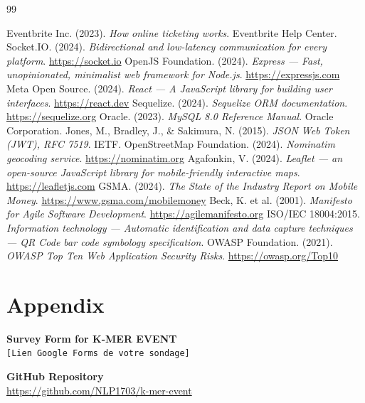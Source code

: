 \documentclass[12pt,a4paper]{report}
\begin{document}
\begin{thebibliography}{99}
 Eventbrite Inc. (2023). \emph{How online ticketing works}. Eventbrite Help Center.
 Socket.IO. (2024). \emph{Bidirectional and low-latency communication for every platform}. \url{https://socket.io}
 OpenJS Foundation. (2024). \emph{Express --- Fast, unopinionated, minimalist web framework for Node.js}. \url{https://expressjs.com}
 Meta Open Source. (2024). \emph{React --- A JavaScript library for building user interfaces}. \url{https://react.dev}
 Sequelize. (2024). \emph{Sequelize ORM documentation}. \url{https://sequelize.org}
 Oracle. (2023). \emph{MySQL 8.0 Reference Manual}. Oracle Corporation.
 Jones, M., Bradley, J., \& Sakimura, N. (2015). \emph{JSON Web Token (JWT), RFC 7519}. IETF.
 OpenStreetMap Foundation. (2024). \emph{Nominatim geocoding service}. \url{https://nominatim.org}
 Agafonkin, V. (2024). \emph{Leaflet --- an open-source JavaScript library for mobile-friendly interactive maps}. \url{https://leafletjs.com}
 GSMA. (2024). \emph{The State of the Industry Report on Mobile Money}. \url{https://www.gsma.com/mobilemoney}
 Beck, K. et al. (2001). \emph{Manifesto for Agile Software Development}. \url{https://agilemanifesto.org}
 ISO/IEC 18004:2015. \emph{Information technology --- Automatic identification and data capture techniques --- QR Code bar code symbology specification}.
 OWASP Foundation. (2021). \emph{OWASP Top Ten Web Application Security Risks}. \url{https://owasp.org/Top10}
\end{thebibliography}

\chapter*{Appendix}
\noindent\textbf{Survey Form for K-MER EVENT}\\
\texttt{[Lien Google Forms de votre sondage]}

\vspace{0.4cm}
\noindent\textbf{GitHub Repository}\\
\url{https://github.com/NLP1703/k-mer-event}
\end{document}
